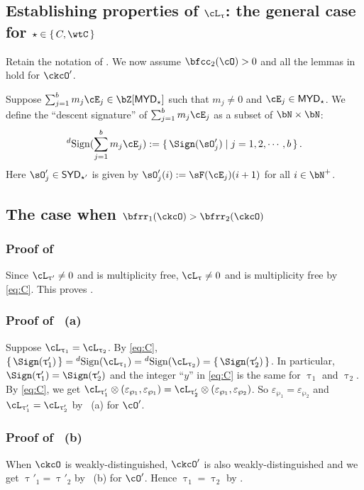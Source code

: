 \documentclass[12pt,a4paper]{amsart}
\def\SYD{{\mathsf{SYD}}}
\def\MYD{{\mathsf{MYD}}}
\numberwithin{equation}{section}
\theoremstyle{remark}
\def\cOp{\cO^{\prime}}
\begin{document}
\subsection{Establishing properties of $\ac_{\uptau}$: the general case for $\star\in \set{C,\wtC}$}
Retain the notation of
. We now assume $\bfcc_{2}(\cO)>0$ and all the lemmas in
 hold for $\ckcO'$.

Suppose $\sum_{j=1}^{b} m_{j} \cE_{j}\in \bZ[\MYD_{\star}]$ such that $m_{j}\neq
0$ and $\cE_{j}\in \MYD_{\star}$. We define the ``descent signature'' of
$\sum_{j=1}^{b} m_{j} \cE_{j}$ as a subset of $\bN\times \bN$:
\[
  \dsign(\sum_{j=1}^{b} m_{j} \cE_{j}) := \set{\Sign(\sO'_{j})|j=1,2,\cdots, b}.
\]
Here $\sO'_{j} \in \SYD_{\star'}$ is given by $\sO'_{j}(i) := \sF(\cE_{j})(i+1)$
for all $i\in \bN^{+}$. %

\subsection*{The case when $\bfrr_{1}(\ckcO)>\bfrr_{2}(\ckcO)$}

\subsubsection*{Proof of } Since $\ac_{\uptau'}\neq 0$ and
is multiplicity free, $\ac_{\uptau}\neq 0$ and is multiplicity free by \eqref{eq:C}.
This proves .

\smallskip

\subsubsection*{Proof of ~(a)} Suppose
$\ac_{\uptau_{1}}=\ac_{\uptau_{2}}$. By \eqref{eq:C},
$\set{\Sign(\uptau'_{1})}=\dsign(\ac_{\uptau_{1}}) =\dsign(\ac_{\uptau_{2}}) =
\set{\Sign(\uptau'_{2})}$. In particular,
$\Sign(\uptau'_{1})=\Sign(\uptau'_{2})$ and the integer ``$y$'' in \eqref{eq:C}
is the same for $\uptau_{1}$ and $\uptau_{2}$. By \eqref{eq:C}, we get
$\ac_{\uptau'_{1}}\otimes
(\varepsilon_{\wp_{1}},\varepsilon_{\wp_{1}})=\ac_{\uptau'_{2}}\otimes
(\varepsilon_{\wp_{1}}, \varepsilon_{\wp_{2}})$. So
$\varepsilon_{\wp_{1}}=\varepsilon_{\wp_{2}}$ and
$\ac_{\uptau'_{1}}=\ac_{\uptau'_{2}}$ by ~(a) for $\cOp$.



\subsubsection*{Proof of ~(b)}
When $\ckcO$ is weakly-distinguished, $\ckcO'$ is also weakly-distinguished and we get $\uptau'_{1}=\uptau'_{2}$ by
~(b) for $\cOp$. Hence $\uptau_{1}=\uptau_{2}$ by .
\end{document}
